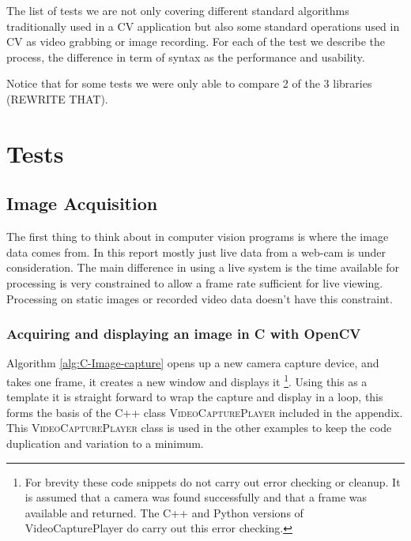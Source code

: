 \documentclass[english]{IEEEtran}
\newcommand{\noun}[1]{\textsc{#1}}
\theoremstyle{plain}
\begin{document}
The list of tests we are not only covering different standard algorithms traditionally used in a
CV application but also some standard operations used in CV as video grabbing or image recording. For each
of the test we describe the process, the difference in term of syntax as the performance and usability.

Notice that for some tests we were only able to compare 2 of the 3 libraries (REWRITE THAT).

\section{Tests}

\subsection{Image Acquisition}

The first thing to think about in computer vision programs is where
the image data comes from. In this report mostly just live data from
a web-cam is under consideration. The main difference in using a live
system is the time available for processing is very constrained to
allow a frame rate sufficient for live viewing. Processing on static
images or recorded video data doesn't have this constraint.

\subsubsection{Acquiring and displaying an image in C with OpenCV}

Algorithm \ref{alg:C-Image-capture} opens up a new camera capture
device, and takes one frame, it creates a new window and displays
it%
\footnote{For brevity these code snippets do not carry out error checking or
cleanup. It is assumed that a camera was found successfully and that
a frame was available and returned. The C++ and Python versions of
VideoCapturePlayer do carry out this error checking.%
}. Using this as a template it is straight forward to wrap the capture
and display in a loop, this forms the basis of the C++ class \noun{VideoCapturePlayer}
included in the appendix. This \noun{VideoCapturePlayer} class is
used in the other examples to keep the code duplication and variation
to a minimum.
\end{document}
